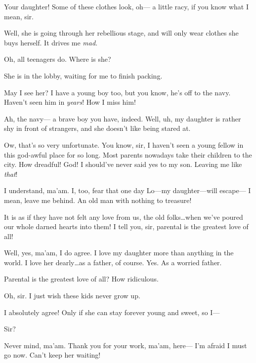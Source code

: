 \documentclass[letterpaper,12pt]{article}
\begin{document}
\custodian%
Your daughter! Some of these clothes look, oh--- a little racy, if you know what I mean, sir.

\hum[chuckling]
Well, she is going through her rebellious stage, and will only wear clothes she buys herself. It drives me \textit{mad}.

\custodian%
Oh, all teenagers do. Where is she?

\hum%
She is in the lobby, waiting for me to finish packing.

\custodian%
May I see her? I have a young boy too, but you know, he's off to the navy. Haven't seen him in \textit{years}! How I miss him!

\hum%
Ah, the navy--- a brave boy you have, indeed. Well, uh, my daughter is rather shy in front of strangers, and she doesn't like being stared at.

\custodian%
Ow, that's so very unfortunate. You know, sir, I haven't seen a young fellow in this god-awful place for so long. Most parents nowadays take their children to the city. How dreadful! God! I should've never said yes to my son. Leaving me like \textit{that}!

\hum%
I understand, ma'am. I, too, fear that one day Lo---my daughter---will escape--- I mean, leave me behind. An old man with nothing to treasure!

\custodian%
It is as if they have not felt any love from us, the old folks\dots when we've poured our whole darned hearts into them! I tell you, sir, parental is the greatest love of all! 

\hum%
Well, yes, ma'am, I do agree. I love my daughter more than anything in the world. I love her dearly\dots as a father, of course. Yes. As a worried father. 

\hum%
Parental is the greatest love of all? How ridiculous.  

\custodian%
Oh, sir. I just wish these kids never grow up.

\hum%
I absolutely agree! Only if she can stay forever young and sweet, so I--- 

\custodian%
Sir?

Never mind, ma'am. Thank you for your work, ma'am, here---  I'm afraid I must go now. Can't keep her waiting!
\end{document}
